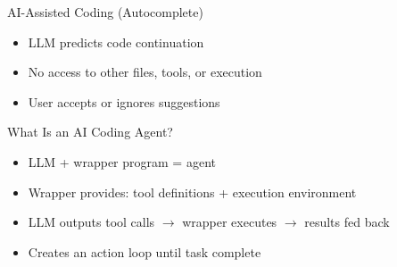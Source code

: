 \documentclass[aspectratio=169]{beamer}
\begin{document}
\begin{frame}{AI-Assisted Coding (Autocomplete)}
\begin{itemize}
    \item LLM predicts code continuation
    \item No access to other files, tools, or execution
    \item User accepts or ignores suggestions
\end{itemize}

\vspace{0.5cm}
\centering
{}
\end{frame}

\begin{frame}{What Is an AI Coding Agent?}
\begin{itemize}
    \item LLM + wrapper program = agent
    \item Wrapper provides: tool definitions + execution environment
    \item LLM outputs tool calls $\to$ wrapper executes $\to$ results fed back
    \item Creates an action loop until task complete
\end{itemize}
\end{frame}
\end{document}
